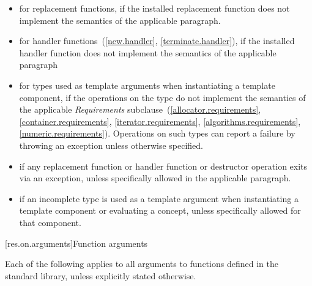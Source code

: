 \begin{itemize}
\item
for replacement functions, if the installed replacement function does not
implement the semantics of the applicable
\required
paragraph.
\item
for handler functions~(\ref{new.handler}, \ref{terminate.handler}),
if the installed handler function does not implement the semantics of the applicable
\required
paragraph
\item
for types used as template arguments when instantiating a template component,
if the operations on the type do not implement the semantics of the applicable
\emph{Requirements}
subclause~(\ref{allocator.requirements}, \ref{container.requirements}, \ref{iterator.requirements},
\ref{algorithms.requirements}, \ref{numeric.requirements}).
Operations on such types can report a failure by throwing an exception
unless otherwise specified.
\item
if any replacement function or handler function or destructor operation exits via an exception,
unless specifically allowed
in the applicable
\required
paragraph.
\item
if an incomplete type is used as a template
argument when instantiating a template component or evaluating a concept, unless specifically
allowed for that component.
\end{itemize}

[res.on.arguments]{Function arguments}

\pnum
{}%
%
Each of the following applies to all arguments
%
to functions defined in the \Cpp{} standard library,%
unless explicitly stated otherwise.

